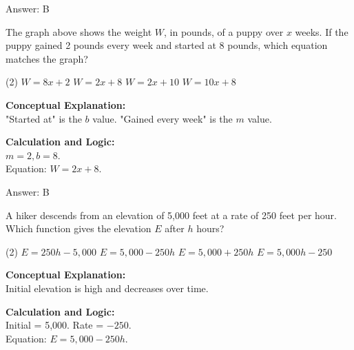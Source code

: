 \documentclass[11pt,paper=a4,answers]{exam}
\begin{document}
\begin{questions}
\begin{solution}
\vspace{15pt}
Answer: \colorbox{yellow!100}{B}
\end{solution}

\vspace{20pt}

\question

The graph above shows the weight $W$, in pounds, of a puppy over $x$ weeks. If the puppy gained 2 pounds every week and started at 8 pounds, which equation matches the graph?
\begin{tasks}(2)
    \task $W = 8x + 2$
    \task $W = 2x + 8$
    \task $W = 2x + 10$
    \task $W = 10x + 8$
\end{tasks}

\begin{solution}
\textbf{Conceptual Explanation:} \\
"Started at" is the $b$ value. "Gained every week" is the $m$ value.

\vspace{10pt}
\textbf{Calculation and Logic:} \\
$m = 2, b = 8$. \\
Equation: $W = 2x + 8$.

\vspace{15pt}
Answer: \colorbox{yellow!100}{B}
\end{solution}

\vspace{20pt}

\question
A hiker descends from an elevation of 5,000 feet at a rate of 250 feet per hour. Which function gives the elevation $E$ after $h$ hours?
\begin{tasks}(2)
    \task $E = 250h - 5,000$
    \task $E = 5,000 - 250h$
    \task $E = 5,000 + 250h$
    \task $E = 5,000h - 250$
\end{tasks}

\begin{solution}
\textbf{Conceptual Explanation:} \\
Initial elevation is high and decreases over time.

\vspace{10pt}
\textbf{Calculation and Logic:} \\
Initial = 5,000. Rate = $-250$. \\
Equation: $E = 5,000 - 250h$.


\end{solution}
\end{questions}
\end{document}
